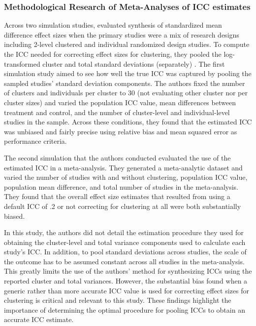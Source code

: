 
\subsubsection{Methodological Research of Meta-Analyses of ICC estimates}

Across two simulation studies,  evaluated synthesis of standardized mean difference effect sizes when the primary studies were a mix of research designs including 2-level clustered and individual randomized design studies. To compute the ICC needed for correcting effect sizes for clustering, they pooled the log-transformed cluster and total standard deviations (separately)   \cite{raudenbushHierarchicalLinearModels2002}. The first simulation study aimed to see how well the true ICC was captured by pooling the sampled studies' standard deviation components. The authors fixed the number of clusters and individuals per cluster to 30 (not evaluating other cluster nor per cluster sizes) and varied the population ICC value, mean differences between treatment and control, and the number of cluster-level and individual-level studies in the sample. Across these conditions, they found that the estimated ICC was unbiased and fairly precise using relative bias and mean squared error as performance criteria. 

The second simulation that the authors conducted evaluated the use of the estimated ICC in a meta-analysis. They generated a meta-analytic dataset and varied the number of studies with and without clustering, population ICC value, population mean difference, and total number of studies in the meta-analysis. They found that the overall effect size estimates that resulted from using a default ICC of .2 or not correcting for clustering at all were both substantially biased. 

In this study, the authors did not detail the estimation procedure they used for obtaining the cluster-level and total variance components used to calculate each study's ICC. In addition, to pool standard deviations across studies, the scale of the outcome has to be assumed constant across all studies in the meta-analysis. This greatly limits the use of the authors' method for synthesizing ICCs using the reported cluster and total variances. However, the substantial bias found when a generic rather than more accurate ICC value is used for correcting effect sizes for clustering is critical and relevant to this study. These findings highlight the importance of determining the optimal procedure for pooling ICCs to obtain an accurate ICC estimate.

 

 





    
  


